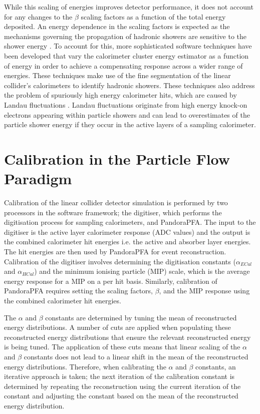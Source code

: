 While this scaling of energies improves detector performance, it does not account for any changes to the $\beta$ scaling factors as a function of the total energy deposited.  An energy dependence in the scaling factors is expected as the mechanisms governing the propagation of hadronic showers are sensitive to the shower energy \cite{Wigmans:2000vf}.  To account for this, more sophisticated software techniques have been developed that vary the calorimeter cluster energy estimator as a function of energy in order to achieve a compensating response across a wider range of energies.  These techniques make use of the fine segmentation of the linear collider's calorimeters to identify hadronic showers.  These techniques also address the problem of spuriously high energy calorimeter hits, which are caused by Landau fluctuations \cite{Landau:1944if}.  Landau fluctuations originate from high energy knock-on electrons appearing within particle showers \cite{Bichsel:2004ej} and can lead to overestimates of the particle shower energy if they occur in the active layers of a sampling calorimeter.  


\section{Calibration in the Particle Flow Paradigm}
\label{sec:overviewcalibration}
Calibration of the linear collider detector simulation is performed by two processors in the software framework; the digitiser, which performs the digitisation process for sampling calorimeters, and PandoraPFA.  The input to the digitiser is the active layer calorimeter response (ADC values) and the output is the combined calorimeter hit energies i.e. the active and absorber layer energies.  The hit energies are then used by PandoraPFA for event reconstruction.  Calibration of the digitiser involves determining the digitisation constants ($\alpha_{ECal}$ and $\alpha_{HCal}$) and the minimum ionising particle (MIP) scale, which is the average energy response for a MIP on a per hit basis.  Similarly, calibration of PandoraPFA requires setting the scaling factors, $\beta$, and the MIP response using the combined calorimeter hit energies.

The $\alpha$ and $\beta$ constants are determined by tuning the mean of reconstructed energy distributions.  A number of cuts are applied when populating these reconstructed energy distributions that ensure the relevant reconstructed energy is being tuned.  The application of these cuts means that linear scaling of the $\alpha$ and $\beta$ constants does not lead to a linear shift in the mean of the reconstructed energy distributions.  Therefore, when calibrating the $\alpha$ and $\beta$ constants, an iterative approach is taken; the next iteration of the calibration constant is determined by repeating the reconstruction using the current iteration of the constant and adjusting the constant based on the mean of the reconstructed energy distribution.  

